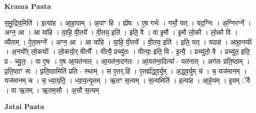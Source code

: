 \documentclass[17pt]{extarticle}
\begin{document}
\textbf{Krama Paata} \newline

स॒मु॒द्रिय॒मिति॑ । इत्या॑ह । आ॒हा॒पाम् । अ॒पाꣳ हि । ह्ये॑षः । ए॒ष गर्भः॑ । गर्भो॒ यत् । यद॒ग्निः । अ॒ग्निरग्ने᳚ । अग्न॒ आ । आ या॑हि । या॒हि॒ वी॒तये᳚ । वी॒तय॒ इति॑ । इति॒ वै । वा इ॒मौ । इ॒मौ लो॒कौ । लो॒कौ वि । व्यै॑ताम् । ऐ॒ता॒मग्ने᳚ । अग्न॒ आ । आ या॑हि । या॒हि॒ वी॒तये᳚ । वी॒तय॒ इति॑ । इति॒ यत् । यदाह॑ । आहा॒नयोः᳚ । अ॒नयो᳚र् लो॒कयोः᳚ । लो॒कयो॒र् वीत्यै᳚ । वीत्यै॒ प्रच्यु॑तः । वीत्या॒ इति॒ वि - इ॒त्यै॒ । प्रच्यु॑तो॒ वै । प्रच्यु॑त॒ इति॒ प्र - च्यु॒तः॒ । वा ए॒षः । ए॒ष आ॒यत॑नात् । आ॒यत॑ना॒दग॑तः । आ॒यत॑ना॒दित्या᳚ - यत॑नात् । अग॑तः प्रति॒ष्ठाम् । प्र॒ति॒ष्ठाꣳ सः । प्र॒ति॒ष्ठामिति॑ प्रति - स्थाम् । स ए॒तर्.हि॑ । ए॒तर्ह्य॑द्ध्व॒र्युम् । अ॒द्ध्व॒र्युम् च॑ । च॒ यज॑मानम् । यज॑मानम् च । च॒ ध्या॒य॒ति॒ । ध्या॒य॒त्यृ॒तम् । ऋ॒तꣳ स॒त्यम् । स॒त्यमिति॑ । इत्या॑ह । आ॒हे॒यम् । इ॒यम् ॅवै । वा ऋ॒तम् । ऋ॒तम॒सौ । अ॒सौ स॒त्यम् \newline

\textbf{Jatai Paata} \newline
\end{document}
